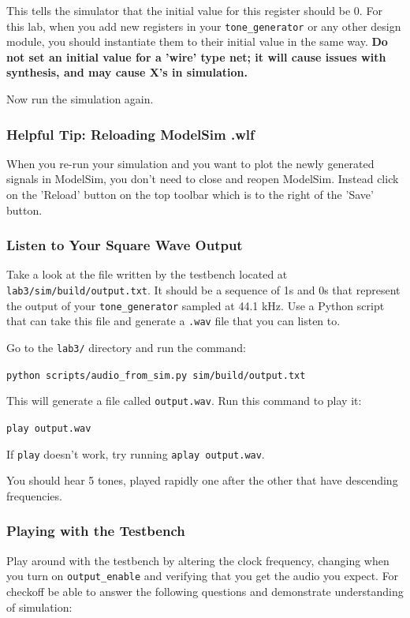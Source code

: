 \documentclass[11pt]{article}
\begin{document}
This tells the simulator that the initial value for this register should be 0. For this lab, when you add new registers in your \verb|tone_generator| or any other design module, you should instantiate them to their initial value in the same way. \textbf{Do not set an initial value for a 'wire' type net; it will cause issues with synthesis, and may cause X's in simulation.}

Now run the simulation again.

\subsubsection{Helpful Tip: Reloading ModelSim .wlf}

When you re-run your simulation and you want to plot the newly generated signals in ModelSim, you don't need to close and reopen ModelSim. Instead click on the 'Reload' button on the top toolbar which is to the right of the 'Save' button.

\subsubsection{Listen to Your Square Wave Output}

Take a look at the file written by the testbench located at \verb|lab3/sim/build/output.txt|. It should be a sequence of 1s and 0s that represent the output of your \verb|tone_generator| sampled at 44.1 kHz. Use a Python script that can take this file and generate a \verb|.wav| file that you can listen to.

Go to the \verb|lab3/| directory and run the command:

\verb|python scripts/audio_from_sim.py sim/build/output.txt|

This will generate a file called \verb|output.wav|. Run this command to play it:

\verb|play output.wav|

If \verb|play| doesn't work, try running \verb|aplay output.wav|.

You should hear 5 tones, played rapidly one after the other that have descending frequencies.

\subsubsection{Playing with the Testbench} \label{checkoff:0}

Play around with the testbench by altering the clock frequency, changing when you turn on \verb|output_enable| and verifying that you get the audio you expect. For checkoff be able to answer the following questions and demonstrate understanding of simulation:
\end{document}
